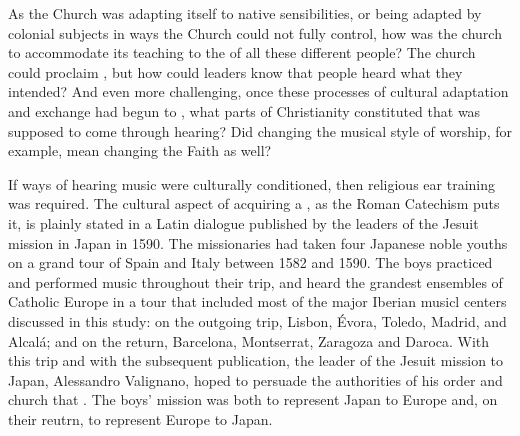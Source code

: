 As the Church was adapting itself to native sensibilities, or being adapted by colonial subjects in ways the Church could not fully control, how was the church to accommodate its teaching to the  of all these different people?
The church could proclaim , but how could leaders know that people heard what they intended?
And even more challenging, once these processes of cultural adaptation and exchange had begun to , what parts of Christianity constituted  that was supposed to come through hearing?
Did changing the musical style of worship, for example, mean changing the Faith as well?

If ways of hearing music were culturally conditioned, then religious ear training was required.
The cultural aspect of acquiring a , as the Roman Catechism puts it, is plainly stated in a Latin dialogue published by the leaders of the Jesuit mission in Japan in 1590.%
\Autocite{Sande:DeMissioneLegatorum}
The missionaries had taken four Japanese noble youths on a grand tour of Spain and Italy between 1582 and 1590.%
The boys practiced and performed music throughout their trip, and heard the grandest ensembles of Catholic Europe in a tour that included most of the major Iberian musicl centers discussed in this study: on the outgoing trip, Lisbon, Évora, Toledo, Madrid, and Alcalá; and on the return, Barcelona, Montserrat, Zaragoza and Daroca.
With this trip and with the subsequent publication, the leader of the Jesuit mission to Japan, Alessandro Valignano, hoped to persuade the authorities of his order and church that .%
\Autocite[4]{Massarella:JapaneseTravellers}
The boys' mission was both to represent Japan to Europe and, on their reutrn, to represent Europe to Japan.

